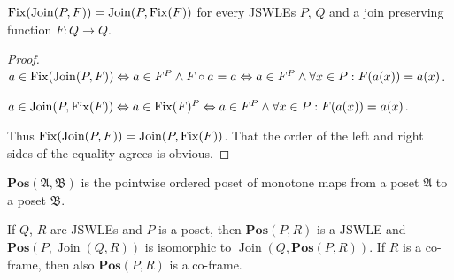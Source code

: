 \begin{lem}
\label{join-fix-inter}$\operatorname{Fix}(\operatorname{Join}(P,F))=\operatorname{Join}(P,\operatorname{Fix}(F))$
for every JSWLEs $P$, $Q$ and a join preserving function $F:Q\rightarrow Q$.\end{lem}
\begin{proof}
$a\in\operatorname{Fix}(\operatorname{Join}(P,F))\Leftrightarrow a\in F^{P}\wedge F\circ a=a\Leftrightarrow a\in F^{P}\wedge\forall x\in P:F(a(x))=a(x)$.

$a\in\operatorname{Join}(P,\operatorname{Fix}(F))\Leftrightarrow a\in\operatorname{Fix}(F)^{P}\Leftrightarrow a\in F^{P}\wedge\forall x\in P:F(a(x))=a(x)$.

Thus $\operatorname{Fix}(\operatorname{Join}(P,F))=\operatorname{Join}(P,\operatorname{Fix}(F))$.
That the order of the left and right sides of the equality agrees
is obvious.\end{proof}
\begin{defn}
$\mathbf{Pos}(\mathfrak{A},\mathfrak{B})$ is the pointwise ordered
poset of monotone maps from a poset $\mathfrak{A}$ to a poset $\mathfrak{B}$.\end{defn}
\begin{lem}
\label{join-pos-interch}If $Q$, $R$ are JSWLEs and $P$ is a poset,
then $\mathbf{Pos}(P,R)$ is a JSWLE and $\mathbf{Pos}(P,\operatorname{Join}(Q,R))$
is isomorphic to $\operatorname{Join}\left(Q,\mathbf{Pos}(P,R)\right)$.
If $R$ is a co-frame, then also $\mathbf{Pos}(P,R)$ is a co-frame.
\end{lem}
